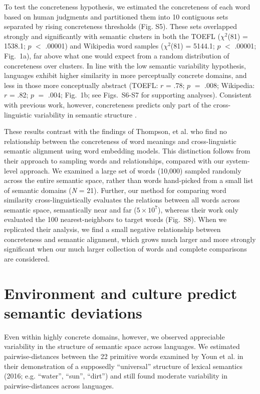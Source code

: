 \documentclass[9pt,twocolumn,twoside,lineno]{pnas-new}
\begin{document}
To test the concreteness hypothesis, we estimated the concreteness of each word based on human judgments and partitioned them into 10 contiguous sets separated by rising concreteness thresholds  \cite{brysbaert2014concreteness} (Fig. S5). These sets overlapped strongly and significantly with semantic clusters in both the TOEFL ($\chi^2$(81) = 1538.1; $p$ $<$ .00001) and Wikipedia word samples ($\chi^2$(81) =  5144.1; $p$ $<$ .00001; Fig.\ 1a), far above what one would expect from a random distribution of concreteness over clusters. In line with the low semantic variability hypothesis, languages exhibit higher similarity in more perceptually concrete domains, and less in those more conceptually abstract (TOEFL: $r$ = .78; $p$ $=$ .008; Wikipedia: $r$ = .82; $p$ $=$ .004; Fig.\ 1b; see  Figs.\ S6-S7 for supporting analyses). Consistent with previous work, however, concreteness predicts only part of the cross-linguistic variability in semantic structure \cite{Malt2003-vv}.

These results contrast with the findings of Thompson, et al. \cite{thompson2020cultural} who find no relationship between the concreteness of word meanings and cross-linguistic semantic alignment using word embedding models. This distinction follows from their approach to sampling words and relationships, compared with our system-level approach. We examined a large set of words (10,000) sampled randomly across the entire semantic space, rather than words hand-picked from a small list of semantic domains ({\it N} = 21). Further, our method for comparing word similarity cross-linguistically evaluates the relations between all words across semantic space, semantically near and far ($5\times10^7$), whereas their work only evaluated the 100 nearest-neighbors to target words (Fig.\ S8). When we replicated their analysis, we find a small negative relationship between concreteness and semantic alignment, which grows much larger and more strongly significant when our much larger collection of words and complete comparisons are considered.  

\section*{Environment and culture predict semantic deviations}
Even within highly concrete domains, however, we observed appreciable variability in the structure of semantic space across languages. We estimated pairwise-distances between the 22 primitive words examined by Youn et al. \cite{youn2016universal} in their demonstration of a supposedly ``universal'' structure of lexical semantics (2016; e.g. ``water'', ``sun'', ``dirt'') and still found moderate variability in pairwise-distances across languages. 
\end{document}
